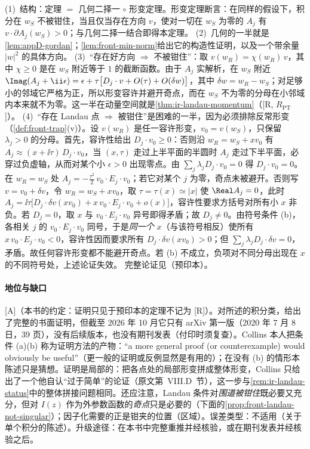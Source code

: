 \begin{proofsketch}
(1)~结构：定理 $=$ 几何二择一 $\circ$ 形变定理。形变定理\cite[定理~2]{Collins:2020euz}断言：在同样的假设下，积分在 $w_S$ 不被钳住，当且仅当存在方向 $v$，使对一切在 $w_S$ 为零的 $A_j$ 有 $v\cdot\partial A_j(w_S)>0$；与几何二择一结合即得本定理。
(2)~几何的一半就是\cref{lem:appD-gordan}；\cref{lem:front-min-norm}给出它的构造性证明，以及一个带余量 $|w|^2$ 的具体方向。
(3)~“存在好方向 $\Rightarrow$ 不被钳住”：取 $v(w_R)=\chi(w_R)\,v$，其中 $\chi\ge0$ 是在 $w_S$ 附近等于 $1$ 的截断函数。由于 $A_j$ 实解析，在 $w_S$ 附近 $\Imag(A_j+\ii\epsilon)=\epsilon+\tau\bigl[D_j\cdot v+O(\tau)+O(\delta w)\bigr]$，其中 $\delta w=w_R-w_S$\cite[式~(2.7)、(8.1)]{Collins:2020euz}；对足够小的邻域它严格为正，所以形变容许并避开奇点，而在 $w_S$ 不为零的分母在小邻域内本来就不为零。这一半在动量空间就是\cref{thm:ir-landau-momentum}（[R, $R_{\mathrm{PT}}$]）。
(4)~“存在 Landau 点 $\Rightarrow$ 被钳住”是困难的一半，因为必须排除反常形变（\cref{def:front-trap}(v)）。设 $v(w_R)$ 是任一容许形变，$v_0=v(w_S)$，只保留 $\lambda_j>0$ 的分母。首先，容许性给出 $D_j\cdot v_0\ge0$：否则沿 $w_R=w_S+xv_0$ 有 $A_j\approx(x+\ii\tau)\,D_j\cdot v_0$，当 $(x,\tau)$ 走过上半平面的半圆时 $A_j$ 走过下半平面，必穿过负虚轴，从而对某个小 $\epsilon>0$ 出现零点。由 $\sum_j\lambda_jD_j\cdot v_0=0$ 得 $D_j\cdot v_0=0$。在 $w_R=w_S$ 处 $A_j=-\frac{\tau^2}{2}\,v_0\cdot E_j\cdot v_0$；若它对某个 $j$ 为零，奇点未被避开。否则写 $v=v_0+\delta v$，令 $w_R=w_S+xv_0$，取 $\tau=\tau(x)\simeq|x|$ 使 $\Real A_j=0$，此时
$A_j=\ii\tau\bigl[D_j\cdot\delta v(xv_0)+x\,v_0\cdot E_j\cdot v_0+o(x)\bigr]$，容许性要求方括号对所有小 $x$ 非负\cite[式~(8.13)--(8.14)]{Collins:2020euz}。若 $D_j=0$，取 $x$ 与 $v_0\cdot E_j\cdot v_0$ 异号即得矛盾；故 $D_j\ne0$。由符号条件 (b)，各相关 $j$ 的 $v_0\cdot E_j\cdot v_0$ 同号，于是\emph{同一个} $x$（与该符号相反）使所有 $x\,v_0\cdot E_j\cdot v_0<0$，容许性因而要求所有 $D_j\cdot\delta v(xv_0)>0$；但 $\sum_j\lambda_jD_j\cdot\delta v=0$，矛盾。故任何容许形变都不能避开奇点\cite[第~VIII.B~节]{Collins:2020euz}。若 (b) 不成立，负项对不同分母出现在 $x$ 的不同符号处，上述论证失效。
完整论证见\cite[第~V--VIII~节]{Collins:2020euz}（预印本）。
\end{proofsketch}

\paragraph{地位与缺口}[A]（本书的约定：证明只见于预印本的定理不记为 [R]）。对所述的积分类，\cite{Collins:2020euz}给出了完整的书面证明，但截至 2026 年 10 月它只有 arXiv 第一版（2020 年 7 月 8 日，39 页），没有后续版本，也没有期刊发表（付印时须复查）。Collins 本人把条件 (a)(b) 称为证明方法的产物：“a more general proof (or counterexample) would obviously be useful”（更一般的证明或反例显然是有用的）；在没有 (b) 的情形本陈述只是猜想。证明是局部的：把各点处的局部形变拼成整体形变，Collins 只给出了一个他自认“过于简单”的论证（原文第~VIII.D~节），这一步与\cref{rem:ir-landau-status}中的整体拼接问题相同。还应注意，Landau 条件对\emph{围道被钳住}既必要又充分，但对 $I(z)$ 作为外参数函数的\emph{奇点}只是必要的（下面的\cref{prop:front-landau-not-singular}）；因子化需要的正是钳夹的位置（区域）。误差类型：不适用（关于单个积分的陈述）。升级途径：在本书中完整重推并经核验，或在期刊发表并经核验之后。

